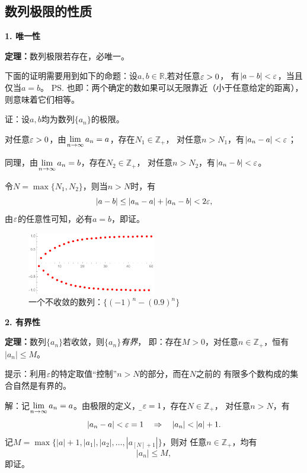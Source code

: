 \subsection{数列极限的性质}


{\bf 1. 唯一性}
\begin{thx}
	{\bf 定理：}数列极限若存在，必唯一。
\end{thx}

下面的证明需要用到如下的命题：设$a,b\in\mathbb{R}$,若对任意$\varepsilon>0$，
有$|a-b|<\varepsilon$，当且仅当$a=b$。
\ps{也即：两个确定的数如果可以无限靠近（小于任意给定的距离），
则意味着它们相等。}

证：设$a,b$均为数列$\{a_n\}$的极限。

对任意$\varepsilon>0$，由$\lim\limits_{n\to\infty} a_n=a$，存在$N_1\in\mathbb{Z}_+$，
对任意$n>N_1$，有$|a_n-a|<\varepsilon$；

同理，由$\lim\limits_{n\to\infty} a_n=b$，存在$N_2\in\mathbb{Z}_+$，
对任意$n>N_2$，有$|a_n-b|<\varepsilon$。

令$N=\max\{N_1,N_2\}$，则当$n>N$时，有
$$|a-b|\leq|a_n-a|+|a_n-b|<2\varepsilon,$$
由$\varepsilon$的任意性可知，必有$a=b$，即证。\fin

\begin{figure}[h]
	\centering
	\includegraphics[width=0.5\textwidth]{./Images/Ch01/an109.pdf}
	\caption{一个不收敛的数列：$\{(-1)^n-(0.9)^n\}$}
	\label{fig:an-diverse}
\end{figure}

\bs
{\bf 2. 有界性}
\begin{thx}
	{\bf 定理：}数列$\{a_n\}$若收敛，则{\it $\{a_n\}$有界}，
	即：存在$M>0$，对任意$n\in\mathbb{Z}_+$，恒有$|a_n|\leq M$。	
\end{thx}

提示：利用$\varepsilon$的特定取值“控制”$n>N$的部分，而在$N$之前的
有限多个数构成的集合自然是有界的。

解：记$\lim\limits_{n\to\infty} a_n=a$。由极限的定义，对{\b$\varepsilon=1$}，存在$N\in\mathbb{Z}_+$，
对任意$n>N$，有
$$|a_n-a|<\e=1\quad\Rightarrow\quad |a_n|<|a|+1.$$
记$M=\max\{|a|+1,|a_1|,|a_2|,\ldots,|a_{[N]+1}|\}$，则对
任意$n\in\mathbb{Z}_+$，均有
$$|a_n|\leq M,$$
即证。\fin

